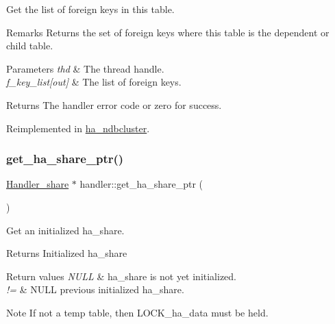 Get the list of foreign keys in this table.

\begin{DoxyRemark}{Remarks}
Returns the set of foreign keys where this table is the dependent or child table.
\end{DoxyRemark}

\begin{DoxyParams}{Parameters}
{\em thd} & The thread handle. \\
\hline
{\em f\+\_\+key\+\_\+list\mbox{[}out\mbox{]}} & The list of foreign keys.\\
\hline
\end{DoxyParams}
\begin{DoxyReturn}{Returns}
The handler error code or zero for success. 
\end{DoxyReturn}


Reimplemented in \mbox{\hyperlink{classha__ndbcluster_a3b97152a2ce0d7e7622de70daae4171b}{ha\+\_\+ndbcluster}}.

\mbox{\label{classhandler_a13bf21a8ad4be872bbfe94f5cb40abca}} 
\subsubsection{\texorpdfstring{get\+\_\+ha\+\_\+share\+\_\+ptr()}{get\_ha\_share\_ptr()}}
{\footnotesize\ttfamily \mbox{\hyperlink{classHandler__share}{Handler\+\_\+share}} $\ast$ handler\+::get\+\_\+ha\+\_\+share\+\_\+ptr (\begin{DoxyParamCaption}{ }\end{DoxyParamCaption})\hspace{0.3cm}{\ttfamily [protected]}}

Get an initialized ha\+\_\+share.

\begin{DoxyReturn}{Returns}
Initialized ha\+\_\+share 
\end{DoxyReturn}

\begin{DoxyRetVals}{Return values}
{\em N\+U\+LL} & ha\+\_\+share is not yet initialized. \\
\hline
{\em !=} & N\+U\+LL previous initialized ha\+\_\+share.\\
\hline
\end{DoxyRetVals}
\begin{DoxyNote}{Note}
If not a temp table, then L\+O\+C\+K\+\_\+ha\+\_\+data must be held. 
\end{DoxyNote}
\mbox{\label{classhandler_a475f7fbe39f6ff0e9da2ac6c3d6c629e}} 
